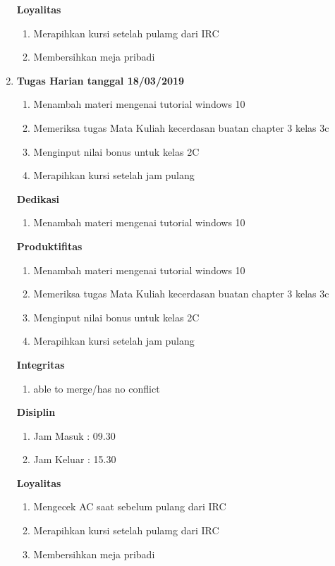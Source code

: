 \begin{enumerate}
\textbf{Loyalitas}
\begin{enumerate}
\item Merapihkan kursi setelah pulamg dari IRC
\item Membersihkan meja pribadi
\end{enumerate}

\item \textbf{Tugas Harian tanggal 18/03/2019}
\begin{enumerate}
\item Menambah materi mengenai tutorial windows 10
\item Memeriksa tugas Mata Kuliah kecerdasan buatan chapter 3 kelas 3c
\item Menginput nilai bonus untuk kelas 2C
\item Merapihkan kursi setelah jam pulang
\end{enumerate}

\textbf{Dedikasi}
\begin{enumerate}
\item Menambah materi mengenai tutorial windows 10
\end{enumerate}

\textbf{Produktifitas}
\begin{enumerate}
\item Menambah materi mengenai tutorial windows 10
\item Memeriksa tugas Mata Kuliah kecerdasan buatan chapter 3 kelas 3c
\item Menginput nilai bonus untuk kelas 2C
\item Merapihkan kursi setelah jam pulang
\end{enumerate}

\textbf{Integritas}
\begin{enumerate}
\item able to merge/has no conflict
\end{enumerate}

\textbf{Disiplin}
\begin{enumerate}
\item Jam Masuk : 09.30
\item Jam Keluar : 15.30
\end{enumerate}

\textbf{Loyalitas}
\begin{enumerate}
\item Mengecek AC saat sebelum pulang dari IRC
\item Merapihkan kursi setelah pulamg dari IRC
\item Membersihkan meja pribadi
\end{enumerate}


\end{enumerate}
